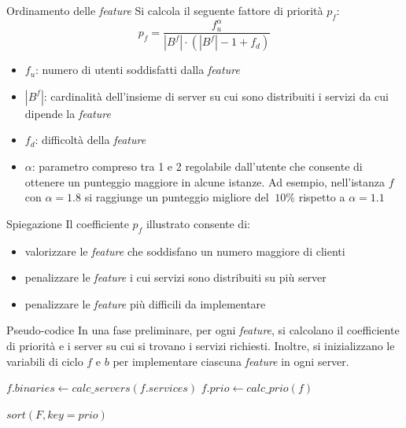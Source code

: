 \documentclass{beamer}
\begin{document}
\begin{frame}{Ordinamento delle \textit{feature}}
Si calcola il seguente fattore di priorità $p_f$:
\begin{equation*}
    p_f = \frac{f_{u}^{\alpha}} {|B^f| \cdot (|B^f| - 1 +  f_d)}
\end{equation*}
\begin{itemize}
    \item $f_u$: numero di utenti soddisfatti dalla \textit{feature}
    \item $|B^f|$: cardinalità dell'insieme di server su cui sono distribuiti i servizi da cui dipende la \textit{feature}
    \item $f_d$: difficoltà della \textit{feature}
    \item $\alpha$: parametro compreso tra 1 e 2 regolabile dall'utente che consente di ottenere un punteggio maggiore in alcune istanze. Ad esempio, nell'istanza $f$ con $\alpha = 1.8$ si raggiunge un punteggio migliore del $~10\%$ rispetto a $\alpha = 1.1$
\end{itemize}
\end{frame}

\begin{frame}{Spiegazione}
    Il coefficiente $p_f$ illustrato consente di:
    \begin{itemize}
        \item valorizzare le \textit{feature} che soddisfano un numero maggiore di clienti 
        \item penalizzare le \textit{feature} i cui servizi sono distribuiti su più server
        \item penalizzare le \textit{feature} più difficili da implementare
    \end{itemize}
\end{frame}


\begin{frame}{Pseudo-codice}
In una fase preliminare, per ogni \textit{feature}, si calcolano il coefficiente di priorità e i server su cui si trovano i servizi richiesti. Inoltre, si inizializzano le variabili di ciclo $f$ e $b$ per implementare ciascuna \textit{feature} in ogni server.

\begin{algorithm}[H]
\begin{algorithmic}[1]

    \State $f.binaries \gets calc\_servers(f.services)$ 
    \State $f.prio \gets calc\_prio(f)$ 
\EndFor

\State $sort(F, key=prio)$ 
\end{algorithmic}
\end{algorithm}


\end{frame}
\end{document}
